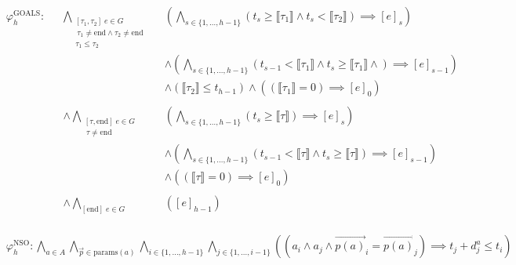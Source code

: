 \documentclass{article}
\begin{document}
\begin{align*}
  &\varphi_{h}^{\text{GOALS}}: && \bigwedge\limits_{\substack{[\tau_1, \tau_2] \; e \in G\\\ \tau_1 \ne \text{end} \land \tau_2 \ne \text{end} \\ \tau_1 \leq \tau_2}} &&\left( \bigwedge\limits_{s \in \{1, \ldots, h-1\}} \left(t_s \geq \llbracket \tau_1 \rrbracket \land t_s < \llbracket \tau_2 \rrbracket \right) \implies [e]_{s} \right)\\
  & && && \land \left( \bigwedge\limits_{s \in \{1, \ldots, h-1\}} \left( t_{s-1} < \llbracket \tau_1 \rrbracket \land t_s \geq \llbracket \tau_1 \rrbracket \land \right) \implies [e]_{s-1} \right)\\
  & && && \land \left( \llbracket \tau_2 \rrbracket \leq t_{h-1} \right) \land \left( \left( \llbracket \tau_1 \rrbracket = 0 \right) \implies [e]_0 \right) \\ \\
  & &&\land \bigwedge\limits_{\substack{[\tau, \text{end}] \; e \in G\\\ \tau \ne \text{end}}} &&\left( \bigwedge\limits_{s \in \{1, \ldots, h-1\}} \left( t_s \geq \llbracket \tau \rrbracket \right) \implies [e]_{s} \right)\\
  & && && \land \left( \bigwedge\limits_{s \in \{1, \ldots, h-1\}} \left( t_{s-1} < \llbracket \tau \rrbracket \land t_s \geq \llbracket \tau \rrbracket \right) \implies [e]_{s-1} \right)\\
  & && && \land \left( \left( \llbracket \tau \rrbracket = 0 \right) \implies [e]_0 \right) \\ \\
  & &&\land \bigwedge\limits_{[\text{end}] \; e \in G} &&\left( [e]_{h-1} \right)\\
\end{align*}

\begin{align*}
  &\varphi_{h}^{\text{NSO}}: \bigwedge\limits_{a \in A} \bigwedge\limits_{\overrightarrow{p} \in \text{params}(a)} \bigwedge\limits_{i \in \{ 1, \ldots, h-1 \}} \bigwedge\limits_{j \in \{ 1, \ldots, i-1 \}} \left( \left( a_i \land a_j \land \overrightarrow{p(a)}_i = \overrightarrow{p(a)}_j\right) \implies t_j + d_j^a \leq t_i \right)
\end{align*}
\end{document}
